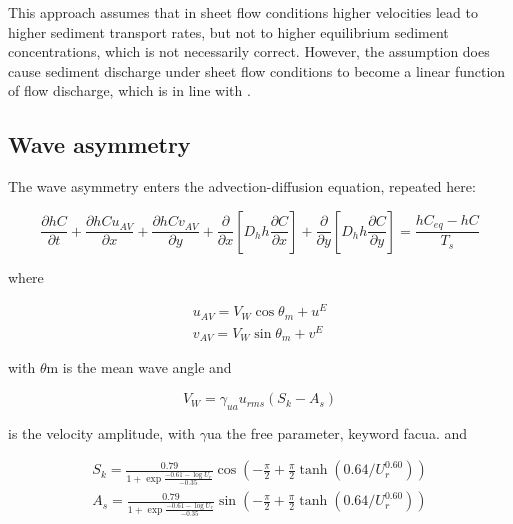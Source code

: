 This approach assumes that in sheet flow conditions higher velocities lead to higher sediment transport rates, but not to higher equilibrium sediment concentrations, which is not necessarily correct. However, the assumption does cause sediment discharge under sheet flow conditions to become a linear function of flow discharge, which is in line with \citet{Kobayashi1996}.

\subsection{ Wave asymmetry}

The wave asymmetry enters the advection-diffusion equation, repeated here:

\begin{equation} \label{2.65)} 
\frac{\partial hC}{\partial t} +\frac{\partial hCu_{AV} }{\partial x} +\frac{\partial hCv_{AV} }{\partial y} +\frac{\partial }{\partial x} \left[D_{h} h\frac{\partial C}{\partial x} \right]+\frac{\partial }{\partial y} \left[D_{h} h\frac{\partial C}{\partial y} \right]=\frac{hC_{eq} -hC}{T_{s} }  
\end{equation} 

where

\begin{equation} \label{2.66)} 
\begin{array}{l} {u_{AV} =V_{W} \cos \theta _{m} +u^{E} } \\ {v_{AV} =V_{W} \sin \theta _{m} +v^{E} } \end{array} 
\end{equation} 

with $\theta $m is the mean wave angle and 

\begin{equation} \label{2.67)} 
V_{W} =\gamma _{ua} u_{rms} \left(S_{k} -A_{s} \right) 
\end{equation} 

is the velocity amplitude, with $\gamma $ua the free parameter, keyword facua. and 

\begin{equation} \label{2.68)} 
\begin{array}{l} {S_{k} =\frac{0.79}{1+\exp \frac{-0.61-\log U_{r} }{-0.35} } \cos \left(-\frac{\pi }{2} +\frac{\pi }{2} \tanh \left(0.64/U_{r}^{0.60} \right)\right)} \\ {A_{s} =\frac{0.79}{1+\exp \frac{-0.61-\log U_{r} }{-0.35} } \sin \left(-\frac{\pi }{2} +\frac{\pi }{2} \tanh \left(0.64/U_{r}^{0.60} \right)\right)} \end{array} 
\end{equation} 

